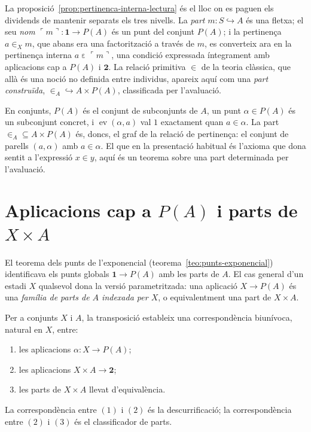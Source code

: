 \begin{observacio}\label{obs:tres-nivells}
La proposició~\ref{prop:pertinenca-interna-lectura} és el lloc on es
paguen els dividends de mantenir separats els tres nivells. La
\emph{part} \(m\colon S\hookrightarrow A\) és una fletxa; el seu
\emph{nom} \(\ulcorner m\urcorner\colon\mathbf1\to P(A)\) és un punt del
conjunt \(P(A)\); i la pertinença \(a\in_X m\), que abans era una
factorització a través de \(m\), es converteix ara en la pertinença
interna \(a\mathrel{\varepsilon}\ulcorner m\urcorner\), una condició
expressada íntegrament amb aplicacions cap a \(P(A)\) i \(\mathbf2\). La
relació primitiva \(\in\) de la teoria clàssica, que allà és una noció no
definida entre individus, apareix aquí com una \emph{part construïda},
\(\in_A\hookrightarrow A\times P(A)\), classificada per l'avaluació.
\end{observacio}

\begin{observacio}\label{obs:pertinenca-interna-classica}
En conjunts, \(P(A)\) és el conjunt de subconjunts de \(A\), un punt
\(\alpha\in P(A)\) és un subconjunt concret, i
\(\operatorname{ev}(\alpha,a)\) val \(1\) exactament quan \(a\in\alpha\).
La part \(\in_A\subseteq A\times P(A)\) és, doncs, el graf de la relació
de pertinença: el conjunt de parells \((a,\alpha)\) amb \(a\in\alpha\). El
que en la presentació habitual és l'axioma que dona sentit a l'expressió
\(x\in y\), aquí és un teorema sobre una part determinada per l'avaluació.
\end{observacio}

\section{\texorpdfstring{Aplicacions cap a \(P(A)\) i parts de \(X\times A\)}{Aplicacions cap a P(A) i parts de X per A}}\label{sec:parts-parametritzades}

El teorema dels punts de l'exponencial (teorema~\ref{teo:punts-exponencial})
identificava els punts globals \(\mathbf1\to P(A)\) amb les parts de
\(A\). El cas general d'un estadi \(X\) qualsevol dona la versió
parametritzada: una aplicació \(X\to P(A)\) és una \emph{família de parts
de \(A\) indexada per \(X\)}, o equivalentment una part de \(X\times A\).

\begin{teorema}\label{teo:parts-parametritzades}
Per a conjunts \(X\) i \(A\), la transposició estableix una
correspondència biunívoca, natural en \(X\), entre:
\begin{enumerate}
\item les aplicacions \(\alpha\colon X\to P(A)\);
\item les aplicacions \(X\times A\to\mathbf2\);
\item les parts de \(X\times A\) llevat d'equivalència.
\end{enumerate}
La correspondència entre \((1)\) i \((2)\) és la descurrificació; la
correspondència entre \((2)\) i \((3)\) és el classificador de parts.
\end{teorema}

